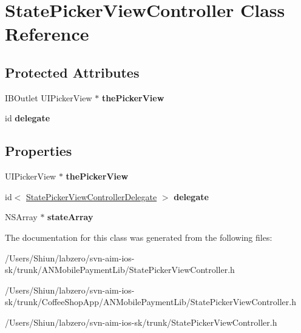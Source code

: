 \hypertarget{interface_state_picker_view_controller}{
\section{StatePickerViewController Class Reference}
\label{interface_state_picker_view_controller}
}
\subsection*{Protected Attributes}
\begin{DoxyCompactItemize}
\item 
\hypertarget{interface_state_picker_view_controller_af858025d7273742d30be1020643021f5}{
IBOutlet UIPickerView $\ast$ {\bfseries thePickerView}}
\label{interface_state_picker_view_controller_af858025d7273742d30be1020643021f5}

\item 
\hypertarget{interface_state_picker_view_controller_a6081d256c3f87ecb99d1cec39ee9b168}{
id {\bfseries delegate}}
\label{interface_state_picker_view_controller_a6081d256c3f87ecb99d1cec39ee9b168}

\end{DoxyCompactItemize}
\subsection*{Properties}
\begin{DoxyCompactItemize}
\item 
\hypertarget{interface_state_picker_view_controller_a636f888379d86e20d91ce10ef0d0a861}{
UIPickerView $\ast$ {\bfseries thePickerView}}
\label{interface_state_picker_view_controller_a636f888379d86e20d91ce10ef0d0a861}

\item 
\hypertarget{interface_state_picker_view_controller_a63098c85fe4a36b9b7cd9f6eca3b4259}{
id$<$ \hyperlink{protocol_state_picker_view_controller_delegate-p}{StatePickerViewControllerDelegate} $>$ {\bfseries delegate}}
\label{interface_state_picker_view_controller_a63098c85fe4a36b9b7cd9f6eca3b4259}

\item 
\hypertarget{interface_state_picker_view_controller_ae203d70adaf4f6f44aa47c3e872119cd}{
NSArray $\ast$ {\bfseries stateArray}}
\label{interface_state_picker_view_controller_ae203d70adaf4f6f44aa47c3e872119cd}

\end{DoxyCompactItemize}


The documentation for this class was generated from the following files:\begin{DoxyCompactItemize}
\item 
/Users/Shiun/labzero/svn-\/aim-\/ios-\/sk/trunk/ANMobilePaymentLib/StatePickerViewController.h\item 
/Users/Shiun/labzero/svn-\/aim-\/ios-\/sk/trunk/CoffeeShopApp/ANMobilePaymentLib/StatePickerViewController.h\item 
/Users/Shiun/labzero/svn-\/aim-\/ios-\/sk/trunk/StatePickerViewController.h\end{DoxyCompactItemize}
